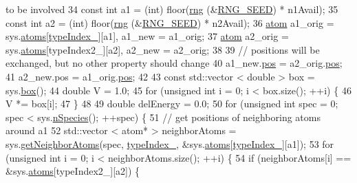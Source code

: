 \begin{DoxyCode}
{       to be involved}
34     \textcolor{keyword}{const} \textcolor{keywordtype}{int} a1 = (int) floor(\hyperlink{utilities_8cpp_a0f9542af4b475ac79cb679d7a8d14db0}{rng} (&\hyperlink{global_8h_a3f4e4ea24d5a5c66feae55d1f329c884}{RNG\_SEED}) * n1Avail);
35     \textcolor{keyword}{const} \textcolor{keywordtype}{int} a2 = (int) floor(\hyperlink{utilities_8cpp_a0f9542af4b475ac79cb679d7a8d14db0}{rng} (&\hyperlink{global_8h_a3f4e4ea24d5a5c66feae55d1f329c884}{RNG\_SEED}) * n2Avail);
36     \hyperlink{classatom}{atom} a1\_orig = sys.\hyperlink{classsim_system_a90421b19082f7fb8fc23b7264b1161e4}{atoms}[\hyperlink{classmc_move_acb731965547b0326ef318ec96da8b46a}{typeIndex\_}][a1], a1\_new = a1\_orig;
37     \hyperlink{classatom}{atom} a2\_orig = sys.\hyperlink{classsim_system_a90421b19082f7fb8fc23b7264b1161e4}{atoms}[typeIndex2\_][a2], a2\_new = a2\_orig;
38 
39     \textcolor{comment}{// positions will be exchanged, but no other property should change}
40     a1\_new.\hyperlink{classatom_a3ae5f4880e7831d8b2c9fda72b4eb24a}{pos} = a2\_orig.\hyperlink{classatom_a3ae5f4880e7831d8b2c9fda72b4eb24a}{pos};
41     a2\_new.pos = a1\_orig.\hyperlink{classatom_a3ae5f4880e7831d8b2c9fda72b4eb24a}{pos};
42 
43     \textcolor{keyword}{const} std::vector < double > box = sys.\hyperlink{classsim_system_a8bff9dfb95b1b09a0fab2c1c485ade07}{box}();
44     \textcolor{keywordtype}{double} V = 1.0;
45     \textcolor{keywordflow}{for} (\textcolor{keywordtype}{unsigned} \textcolor{keywordtype}{int} i = 0; i < box.size(); ++i) \{
46             V *= box[i];
47         \}
48 
49         \textcolor{keywordtype}{double} delEnergy = 0.0;
50         \textcolor{keywordflow}{for} (\textcolor{keywordtype}{unsigned} \textcolor{keywordtype}{int} spec = 0; spec < sys.\hyperlink{classsim_system_ab5e2e9b6204de15520302fe1d51688dd}{nSpecies}(); ++spec) \{
51             \textcolor{comment}{// get positions of neighboring atoms around a1}
52             std::vector < atom* > neighborAtoms = sys.\hyperlink{classsim_system_a9b3aeefa22c3b50b5913df6eea753bc6}{getNeighborAtoms}(spec, 
      \hyperlink{classmc_move_acb731965547b0326ef318ec96da8b46a}{typeIndex\_}, &sys.\hyperlink{classsim_system_a90421b19082f7fb8fc23b7264b1161e4}{atoms}[\hyperlink{classmc_move_acb731965547b0326ef318ec96da8b46a}{typeIndex\_}][a1]);
53             \textcolor{keywordflow}{for} (\textcolor{keywordtype}{unsigned} \textcolor{keywordtype}{int} i = 0; i < neighborAtoms.size(); ++i) \{
54                 \textcolor{keywordflow}{if} (neighborAtoms[i] == &sys.\hyperlink{classsim_system_a90421b19082f7fb8fc23b7264b1161e4}{atoms}[typeIndex2\_][a2]) \{

\end{DoxyCode}
